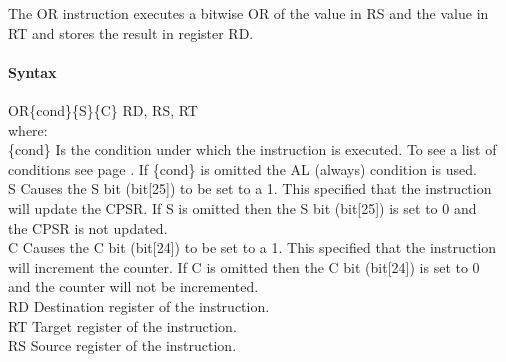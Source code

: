 \documentclass[12pt]{article}
\begin{document}
    \noindent
    The OR instruction executes a bitwise OR of the value in RS and the value in RT and stores the result in register RD. 
    
    \paragraph{Syntax}
    \begin{flushleft}
    OR\{cond\}\{S\}\{C\} RD, RS, RT\\
    \vspace{1em}        %
    where:\\
    \vspace{1em}
    \{cond\}    \hspace{2em} Is the condition under which the instruction is executed. To see a list of\\
                \hspace{5.4em} conditions see page . If \{cond\} is omitted the AL (always) condition is used.\\
    \vspace{1em}    
    S       \hspace{4.5em} Causes the S bit (bit[25]) to be set to a 1. This specified that the instruction\\
            \hspace{5.4em} will update the CPSR. If S is omitted then the S bit (bit[25]) is set to 0 and\\
            \hspace{5.4em} the CPSR is not updated.\\
    \vspace{1em}    
    C       \hspace{4.5em} Causes the C bit (bit[24]) to be set to a 1. This specified that the instruction\\
            \hspace{5.4em} will increment the counter. If C is omitted then the C bit (bit[24]) is set to 0\\
            \hspace{5.4em} and the counter will not be incremented.\\
    \vspace{1em}
    RD  \hspace{3.6em} Destination register of the instruction.\\
    \vspace{1em}
    RT  \hspace{3.7em} Target register of the instruction.\\
    \vspace{1em}
    RS  \hspace{3.85em} Source register of the instruction.\\
    \end{flushleft}
    
\end{document}
